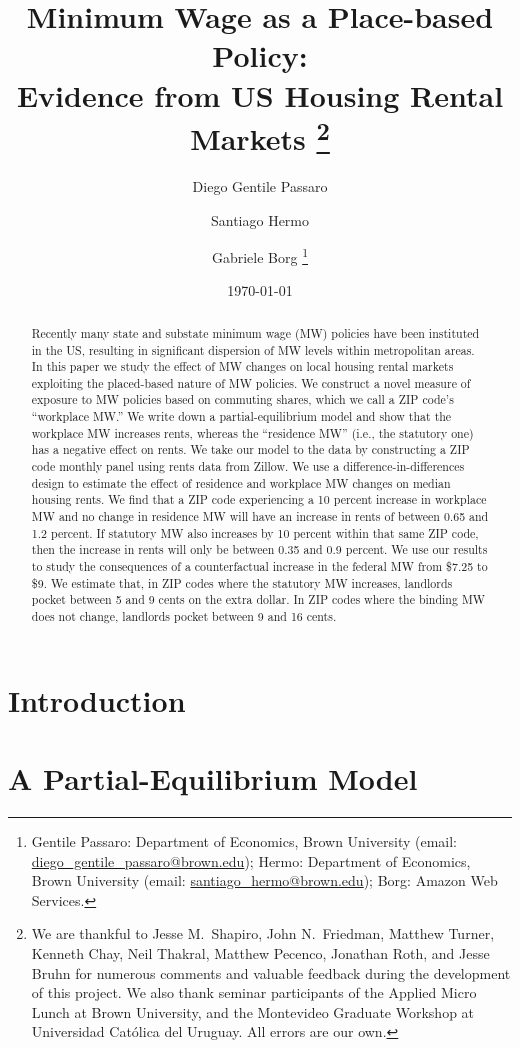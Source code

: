 \documentclass{article}
\title{ Minimum Wage as a Place-based Policy: \\
        Evidence from US Housing Rental Markets
        \thanks{We are thankful to Jesse M.\ Shapiro, John N.\ Friedman, Matthew 
        Turner, Kenneth Chay, Neil Thakral, Matthew Pecenco, Jonathan Roth, and 
        Jesse Bruhn for numerous comments and valuable feedback during the 
        development of this project.
        We also thank seminar participants of the Applied Micro Lunch at Brown
        University, and the Montevideo Graduate Workshop at Universidad Católica 
        del Uruguay.
        All errors are our own.}}
\author{Diego Gentile Passaro \and Santiago Hermo \and Gabriele Borg
        \footnote{Gentile Passaro: Department of Economics, Brown University 
        (email: \url{diego_gentile_passaro@brown.edu}); 
        Hermo: Department of Economics, Brown University 
        (email: \url{santiago_hermo@brown.edu});
        Borg: Amazon Web Services.}}
\date{\today}
\begin{document}
\maketitle

\begin{abstract}
    \noindent
    Recently many state and substate minimum wage (MW) policies have been 
    instituted in the US, resulting in significant dispersion of MW levels within 
    metropolitan areas.
    In this paper we study the effect of MW changes on local housing rental 
    markets exploiting the placed-based nature of MW policies.
    We construct a novel measure of exposure to MW policies based on commuting 
    shares, which we call a ZIP code's ``workplace MW.''
    We write down a partial-equilibrium model and show that the workplace MW 
    increases rents, whereas the ``residence MW'' (i.e., the statutory one) has 
    a negative effect on rents.
    We take our model to the data by constructing a ZIP code monthly panel using 
    rents data from Zillow.
    We use a difference-in-differences design to estimate the effect of residence 
    and workplace MW changes on median housing rents.
    We find that a ZIP code experiencing a 10 percent increase in workplace MW and 
    no change in residence MW will have an increase in rents of between 0.65 and 
    1.2 percent.
    If statutory MW also increases by 10 percent within that same ZIP code, then 
    the increase in rents will only be between 0.35 and 0.9 percent.
    We use our results to study the consequences of a counterfactual increase in 
    the federal MW from \$7.25 to \$9.
    We estimate that, in ZIP codes where the statutory MW increases, landlords 
    pocket between 5 and 9 cents on the extra dollar. In ZIP codes where the 
    binding MW does not change, landlords pocket between 9 and 16 cents.
\end{abstract}

\vspace{5mm}


\clearpage

\section{Introduction}\label{sec:intro}
    

\section{A Partial-Equilibrium Model}\label{sec:model}
    
\end{document}
